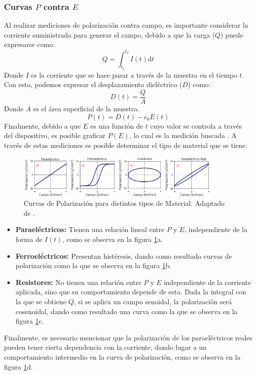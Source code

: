 \documentclass[../main.tex]{subfiles}
\begin{document}
\subsubsection{Curvas \texorpdfstring{$P$}{P} contra \texorpdfstring{$E$}{E}}
Al realizar mediciones de polarización contra campo, es importante considerar la corriente suministrada para generar el campo, debido a que la carga ($Q$) puede expresarse como:
\begin{equation}
    Q=\int_{t_1}^{t_2}I(t)\text{d}t
    \label{eq:cargaintensidad}
\end{equation}
Donde $I$ es la corriente que se hace pasar a través de la muestra en el tiempo $t$.
Con esto, podemos expresar el desplazamiento dieléctrico ($D$) como:
\begin{equation}
    D(t)=\dfrac{Q}{A}
    \label{eq:despdielec}
\end{equation}
Donde $A$ es el área superficial de la muestra.
\begin{equation}
    P(t)=D(t)-\epsilon_0E(t)
    \label{eq:polarizacionec}
\end{equation}
Finalmente, debido a que $E$ es una función de $t$ cuyo valor se controla a través del dispositivo, es posible graficar $P(E)$, lo cual es la medición buscada \cite{Stewart1999}. A través de estas mediciones es posible determinar el tipo de material que se tiene.
\begin{figure}[H]
    \centering
    \includegraphics[width=0.9\textwidth]{fig/PEloop.png}
    \caption{Curvas de Polarización para distintos tipos de Material. Adaptado de \cite{Stewart1999}.}
    \label{fig:PEloop}
\end{figure}
\begin{itemize}
  \item \textbf{Paraeléctricos:} Tienen una relación lineal entre $P$ y $E$, independiente de la forma de $I(t)$, como se observa en la figura \ref{fig:PEloop}a.
  \item \textbf{Ferroeléctricos:} Presentan histéresis, dando como resultado curvas de polarización como la que se observa en la figura \ref{fig:PEloop}b.
  \item \textbf{Resistores:} No tienen una relación entre $P$ y $E$ independiente de la corriente aplicada, sino que su comportamiento depende de esta. Dada la integral con la que se obtiene $Q$, si se aplica un campo senoidal, la polarización será cosenoidal, dando como resultado una curva como la que se observa en la figura \ref{fig:PEloop}c.
\end{itemize}
Finalmente, es necesario mencionar que la polarización de los paraeléctricos reales pueden tener cierta dependencia con la corriente, dando lugar a un comportamiento intermedio en la curva de polarización, como se observa en la figura \ref{fig:PEloop}d.
\end{document}

